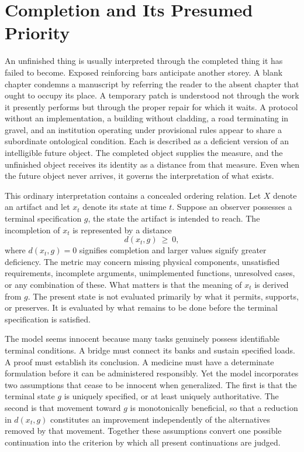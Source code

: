 \section{Completion and Its Presumed Priority}

An unfinished thing is usually interpreted through the completed thing it has failed to become. Exposed reinforcing bars anticipate another storey. A blank chapter condemns a manuscript by referring the reader to the absent chapter that ought to occupy its place. A temporary patch is understood not through the work it presently performs but through the proper repair for which it waits. A protocol without an implementation, a building without cladding, a road terminating in gravel, and an institution operating under provisional rules appear to share a subordinate ontological condition. Each is described as a deficient version of an intelligible future object. The completed object supplies the measure, and the unfinished object receives its identity as a distance from that measure. Even when the future object never arrives, it governs the interpretation of what exists.

This ordinary interpretation contains a concealed ordering relation. Let $X$ denote an artifact and let $x_t$ denote its state at time $t$. Suppose an observer possesses a terminal specification $g$, the state the artifact is intended to reach. The incompletion of $x_t$ is represented by a distance
\begin{equation}\label{eq:distance}
d(x_t,g)\ \geq\ 0,
\end{equation}
where $d(x_t,g)=0$ signifies completion and larger values signify greater deficiency. The metric may concern missing physical components, unsatisfied requirements, incomplete arguments, unimplemented functions, unresolved cases, or any combination of these. What matters is that the meaning of $x_t$ is derived from $g$. The present state is not evaluated primarily by what it permits, supports, or preserves. It is evaluated by what remains to be done before the terminal specification is satisfied.

The model seems innocent because many tasks genuinely possess identifiable terminal conditions. A bridge must connect its banks and sustain specified loads. A proof must establish its conclusion. A medicine must have a determinate formulation before it can be administered responsibly. Yet the model incorporates two assumptions that cease to be innocent when generalized. The first is that the terminal state $g$ is uniquely specified, or at least uniquely authoritative. The second is that movement toward $g$ is monotonically beneficial, so that a reduction in $d(x_t,g)$ constitutes an improvement independently of the alternatives removed by that movement. Together these assumptions convert one possible continuation into the criterion by which all present continuations are judged.

